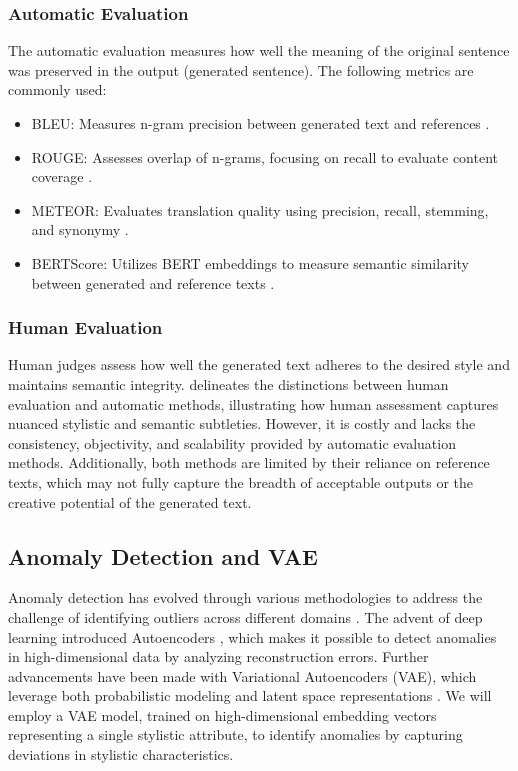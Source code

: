 \subsubsection{Automatic Evaluation}
The automatic evaluation measures how well the meaning of the original sentence was preserved in the output (generated sentence). The following metrics are commonly used:
\begin{itemize}
    \item BLEU: Measures n-gram precision between generated text and references \cite{papineni-etal-2002-bleu}.
    \item ROUGE: Assesses overlap of n-grams, focusing on recall to evaluate content coverage \cite{lin-2004-rouge}.
    \item METEOR: Evaluates translation quality using precision, recall, stemming, and synonymy \cite{banerjee-lavie-2005-meteor}.
    \item BERTScore: Utilizes BERT embeddings to measure semantic similarity between generated and reference texts \cite{zhang2020bertscoreevaluatingtextgeneration}.
\end{itemize}

\subsubsection{Human Evaluation}
Human judges assess how well the generated text adheres to the desired style and maintains semantic integrity. \cite{Yamshchikov_2021} delineates the distinctions between human evaluation and automatic methods, illustrating how human assessment captures nuanced stylistic and semantic subtleties. However, it is costly and lacks the consistency, objectivity, and scalability provided by automatic evaluation methods. Additionally, both methods are limited by their reliance on reference texts, which may not fully capture the breadth of acceptable outputs or the creative potential of the generated text. 

\subsection{Anomaly Detection and VAE}
Anomaly detection has evolved through various methodologies to address the challenge of identifying outliers across different domains \cite{NIPS1999_8725fb77, 4781136}. The advent of deep learning introduced Autoencoders \cite{article}, which makes it possible to detect anomalies in high-dimensional data by analyzing reconstruction errors. Further advancements have been made with Variational Autoencoders (VAE), which leverage both probabilistic modeling and latent space representations \cite{kingma2022autoencodingvariationalbayes}. We will employ a VAE model, trained on high-dimensional embedding vectors representing a single stylistic attribute, to identify anomalies by capturing deviations in stylistic characteristics.